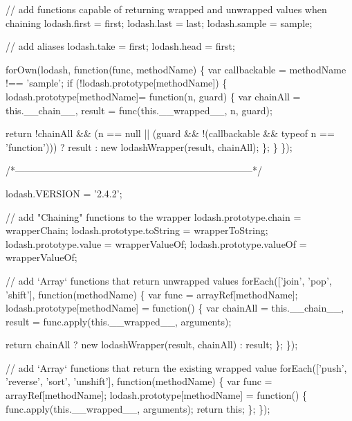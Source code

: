 \begin{DoxyCodeInclude}
    \textcolor{comment}{// add functions capable of returning wrapped and unwrapped values when chaining}
    lodash.first = first;
    lodash.last = last;
    lodash.sample = sample;

    \textcolor{comment}{// add aliases}
    lodash.take = first;
    lodash.head = first;

    forOwn(lodash, \textcolor{keyword}{function}(func, methodName) \{
      var callbackable = methodName !== \textcolor{stringliteral}{'sample'};
      \textcolor{keywordflow}{if} (!lodash.prototype[methodName]) \{
        lodash.prototype[methodName]= function(n, guard) \{
          var chainAll = this.\_\_chain\_\_,
              result = func(this.\_\_wrapped\_\_, n, guard);

          return !chainAll && (n == null || (guard && !(callbackable && typeof n == \textcolor{stringliteral}{'function'})))
            ? result
            : new lodashWrapper(result, chainAll);
        \};
      \}
    \});

    \textcolor{comment}{/*--------------------------------------------------------------------------*/}

    lodash.VERSION = \textcolor{stringliteral}{'2.4.2'};

    \textcolor{comment}{// add "Chaining" functions to the wrapper}
    lodash.prototype.chain = wrapperChain;
    lodash.prototype.toString = wrapperToString;
    lodash.prototype.value = wrapperValueOf;
    lodash.prototype.valueOf = wrapperValueOf;

    \textcolor{comment}{// add `Array` functions that return unwrapped values}
    forEach([\textcolor{stringliteral}{'join'}, \textcolor{stringliteral}{'pop'}, \textcolor{stringliteral}{'shift'}], \textcolor{keyword}{function}(methodName) \{
      var func = arrayRef[methodName];
      lodash.prototype[methodName] = \textcolor{keyword}{function}() \{
        var chainAll = this.\_\_chain\_\_,
            result = func.apply(this.\_\_wrapped\_\_, arguments);

        \textcolor{keywordflow}{return} chainAll
          ? \textcolor{keyword}{new} lodashWrapper(result, chainAll)
          : result;
      \};
    \});

    \textcolor{comment}{// add `Array` functions that return the existing wrapped value}
    forEach([\textcolor{stringliteral}{'push'}, \textcolor{stringliteral}{'reverse'}, \textcolor{stringliteral}{'sort'}, \textcolor{stringliteral}{'unshift'}], \textcolor{keyword}{function}(methodName) \{
      var func = arrayRef[methodName];
      lodash.prototype[methodName] = \textcolor{keyword}{function}() \{
        func.apply(this.\_\_wrapped\_\_, arguments);
        \textcolor{keywordflow}{return} \textcolor{keyword}{this};
      \};
    \});


\end{DoxyCodeInclude}

